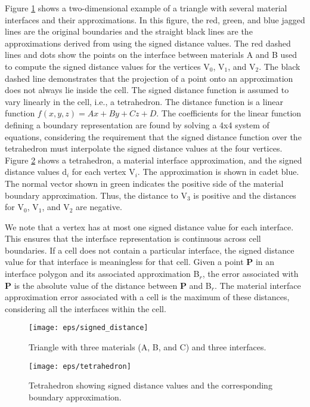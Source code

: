 \documentclass{siggraph}
\begin{document}
Figure \ref{SignedDistance} shows a two-dimensional example of a
triangle with several material interfaces and their approximations.
In this figure, the red, green, and blue jagged lines are the original
boundaries and the straight black lines are the approximations derived
from using the signed distance values.  The red dashed lines and dots
show the points on the interface between materials A and B used to
compute the signed distance values for the vertices V$_{0}$, V$_{1}$,
and V$_{2}$.  The black dashed line demonstrates that the projection of
a point onto an approximation does not always lie inside the cell.
The signed distance function is assumed to vary linearly in the cell,
i.e., a tetrahedron.  The distance function is a linear function
$f(x,y,z) = Ax + By + Cz +D$.  The coefficients for the linear
function defining a boundary representation are found by solving a 4x4
system of equations, considering the requirement that the signed
distance function over the tetrahedron must interpolate the signed
distance values at the four vertices.  Figure \ref{TetBoundaryRep}
shows a tetrahedron, a material interface approximation, and the
signed distance values d$_{i}$ for each vertex V$_{i}$.  The
approximation is shown in cadet blue.  The normal vector shown in
green indicates the positive side of the material boundary
approximation.  Thus, the distance to V$_{3}$ is positive and the
distances for V$_{0}$, V$_{1}$, and V$_{2}$ are negative.

We note that a vertex has at most one signed distance value for each
interface.  This ensures that the interface representation is
continuous across cell boundaries.  If a cell does not contain a
particular interface, the signed distance value for that interface is
meaningless for that cell.  Given a point {\bf{P}} in an interface
polygon and its associated approximation B$_{r}$, the error associated
with {\bf{P}} is the absolute value of the distance between {\bf{P}}
and B$_{r}$.  The material interface approximation error associated
with a cell is the maximum of these distances, considering all the
interfaces within the cell.

\begin{figure}
\begin{center}
\texttt{[image: eps/signed\_distance]}
\caption{Triangle with three materials (A, B, and C) and three interfaces.}
\label{SignedDistance}
\end{center}
\end{figure}


\begin{figure}
\begin{center}
\texttt{[image: eps/tetrahedron]}
\caption{Tetrahedron showing signed distance values and the corresponding boundary approximation.}
\label{TetBoundaryRep}
\end{center}
\end{figure}
\end{document}
